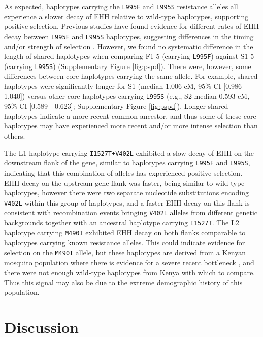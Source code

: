 \documentclass[a4paper,11pt,abstracton,hidelinks]{scrartcl}
\begin{document}
%
As expected, haplotypes carrying the \texttt{L995F} and \texttt{L995S} resistance alleles all experience a slower decay of EHH relative to wild-type haplotypes, supporting positive selection.
%
Previous studies have found evidence for different rates of EHH decay between \texttt{L995F} and \texttt{L995S} haplotypes,
suggesting differences in the timing and/or strength of selection \cite{Lynd2010}.
%
However, we found no systematic difference in the length of shared haplotypes when comparing F1-5 (carrying \texttt{L995F}) against S1-5 (carrying \texttt{L995S}) (Supplementary Figure \ref{fig:pspd}).
%
There were, however, some differences between core haplotypes carrying the same allele.
%
For example, shared haplotypes were significantly longer for S1 (median 1.006 cM, 95\% CI [0.986 - 1.040]) versus other core haplotypes carrying \texttt{L995S} (e.g., S2 median 0.593 cM, 95\% CI [0.589 - 0.623]; Supplementary Figure \ref{fig:pspd}).
%
Longer shared haplotypes indicate a more recent common ancestor, and thus some of these core haplotypes may have experienced more recent and/or more intense selection than others.


The L1 haplotype carrying \texttt{I1527T+V402L} exhibited a slow decay of EHH on the downstream flank of the gene, similar to haplotypes carrying \texttt{L995F} and \texttt{L995S}, indicating that this combination of alleles has experienced positive selection.
%
EHH decay on the upstream gene flank was faster, being similar to wild-type haplotypes, however there were two separate nucleotide substitutions encoding \texttt{V402L} within this group of haplotypes, and a faster EHH decay on this flank is consistent with recombination events bringing \texttt{V402L} alleles from different genetic backgrounds together with an ancestral haplotype carrying \texttt{I1527T}.
%
The L2 haplotype carrying \texttt{M490I} exhibited EHH decay on both flanks comparable to haplotypes carrying known resistance alleles.
%
This could indicate evidence for selection on the \texttt{M490I} allele, but these haplotypes are derived from a Kenyan mosquito population where there is evidence for a severe recent bottleneck \cite{Ag1000gConsortium2017}, and there were not enough wild-type haplotypes from Kenya with which to compare.
%
Thus this signal may also be due to the extreme demographic history of this population.


\section*{Discussion}
\end{document}
